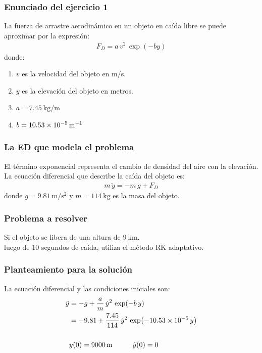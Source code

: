 \documentclass[12pt]{beamer}
\begin{document}
\begin{frame}
\frametitle{Enunciado del ejercicio 1}
La fuerza de arrastre aerodinámico en un objeto en caída libre se puede aproximar por la expresión:
\pause
\begin{align*}
F_{D} = a \, v^{2} \, \exp(-by)
\end{align*}
donde:
\pause
{}
\begin{enumerate}[<+->]
\item $v$ es la velocidad del objeto en m/s.
\item $y$ es la elevación del objeto en metros.
\item $a = \SI{7.45}{\kilo\gram\per\metre}$
\item $b = \SI{10.53d-5}{\per\metre}$
\end{enumerate}
\end{frame}
\begin{frame}
\frametitle{La ED que modela el problema}
El término exponencial representa el cambio de densidad del aire con la elevación.
\\
\bigskip
\pause
La ecuación diferencial que describe la caída del objeto es:
\pause
\begin{align*}
m \, \ddot{y} = - m \, g + F_{D}
\end{align*}
donde $g = \SI{9.81}{\meter\per\square\second}$ y $ m = \SI{114}{\kilo\gram}$ es la masa del objeto.
\end{frame}
\begin{frame}
\frametitle{Problema a resolver}
Si el objeto se libera de una altura de $\SI{9}{\kilo\meter}$.
\\
\bigskip
\pause
\textbf{} luego de $10$ segundos de caída, utiliza el método RK adaptativo.
\end{frame}
\begin{frame}
\frametitle{Planteamiento para la solución}
La ecuación diferencial y las condiciones iniciales son:
\pause
\begin{align*}
\ddot{y} &= - g + \dfrac{a}{m} \, \dot{y}^{2} \, \exp(-b \, y) \\
&= -9.81 + \dfrac{7.45}{114} \, \dot{y}^{2} \, \exp(\num{-10.53d-5} \, y) \\
{} \\
&{} y(0) = \SI{9000}{\meter} \hspace{1cm} \dot{y}(0) = 0
\end{align*}
\end{frame}
\end{document}

